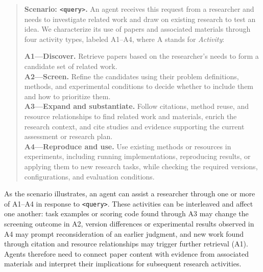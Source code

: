 \documentclass[sigconf,review,anonymous]{acmart}
\begin{document}
\begin{quote}
\small
\textbf{Scenario: \texttt{<query>}.} An agent receives this request from a
researcher and needs to investigate related work and draw on existing research
to test an idea. We characterize its use of papers and associated materials
through four activity types, labeled A1--A4, where A stands for \emph{Activity}:

\textbf{A1---Discover.} Retrieve papers based on the researcher's needs to
form a candidate set of related work.\\[2pt]
\textbf{A2---Screen.} Refine the candidates using their problem definitions,
methods, and experimental conditions to decide whether to include them and
how to prioritize them.\\[2pt]
\textbf{A3---Expand and substantiate.} Follow citations, method reuse, and
resource relationships to find related work and materials, enrich the research
context, and cite studies and evidence supporting the current assessment or
research plan.\\[2pt]
\textbf{A4---Reproduce and use.} Use existing methods or resources in experiments,
including running implementations, reproducing results, or applying them to new
research tasks, while checking the required versions, configurations, and
evaluation conditions.
\end{quote}


As the scenario illustrates, an agent can assist a researcher through one or
more of A1--A4 in response to \texttt{<query>}. These activities can be
interleaved and affect one another: task examples or scoring code found through
A3 may change the screening outcome in A2, version differences or experimental
results observed in A4 may prompt reconsideration of an earlier judgment, and
new work found through citation and resource relationships may trigger further
retrieval (A1). Agents therefore need to
connect paper content with evidence from associated materials and interpret
their implications for subsequent research activities.
\end{document}
